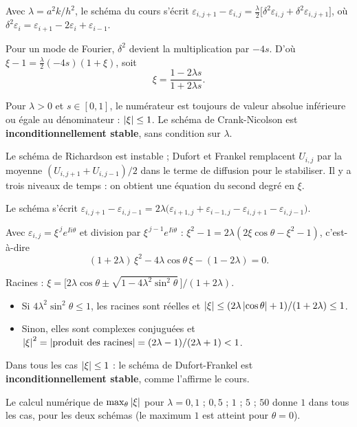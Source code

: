  Avec $\lambda = a^2k/h^2$, le schéma du cours s'écrit
$\varepsilon_{i,j+1} - \varepsilon_{i,j} = \frac\lambda2\bigl[\delta^2\varepsilon_{i,j}
+ \delta^2\varepsilon_{i,j+1}\bigr]$, où
$\delta^2\varepsilon_i = \varepsilon_{i+1} - 2\varepsilon_i + \varepsilon_{i-1}$.

 Pour un mode de Fourier, $\delta^2$ devient la multiplication par
$-4s$. D'où $\xi - 1 = \frac\lambda2(-4s)(1 + \xi)$, soit
\[
  \xi = \frac{1 - 2\lambda s}{1 + 2\lambda s} .
\]

 Pour $\lambda > 0$ et $s \in [0,1]$, le numérateur est toujours de
valeur absolue inférieure ou égale au dénominateur : $\left|\xi\right| \le 1$. Le
schéma de Crank-Nicolson est \textbf{inconditionnellement stable}, sans
condition sur $\lambda$.

\Pourquoi Le schéma de Richardson est instable ; Dufort et Frankel remplacent
$U_{i,j}$ par la moyenne $(U_{i,j+1} + U_{i,j-1})/2$ dans le terme de
diffusion pour le stabiliser. Il y a trois niveaux de temps : on obtient une
équation du second degré en $\xi$.

 Le schéma s'écrit
$\varepsilon_{i,j+1} - \varepsilon_{i,j-1} = 2\lambda\bigl(\varepsilon_{i+1,j}
+ \varepsilon_{i-1,j} - \varepsilon_{i,j+1} - \varepsilon_{i,j-1}\bigr)$.

 Avec $\varepsilon_{i,j} = \xi^{\,j}e^{Ii\theta}$ et division par
$\xi^{\,j-1}e^{Ii\theta}$ :
$\xi^2 - 1 = 2\lambda(2\xi\cos\theta - \xi^2 - 1)$, c'est-à-dire
\[
  (1 + 2\lambda)\,\xi^2 - 4\lambda\cos\theta\,\xi - (1 - 2\lambda) = 0 .
\]

 Racines :
$\xi = \bigl[2\lambda\cos\theta \pm \sqrt{1 - 4\lambda^2\sin^2\theta}\,\bigr]/(1 + 2\lambda)$.
\begin{itemize}
  \item Si $4\lambda^2\sin^2\theta \le 1$, les racines sont réelles et
        $\left|\xi\right| \le (2\lambda\left|\cos\theta\right| + 1)/(1 + 2\lambda) \le 1$.
  \item Sinon, elles sont complexes conjuguées et
        $\left|\xi\right|^2 = \left|\text{produit des racines}\right| =
        (2\lambda - 1)/(2\lambda + 1) < 1$.
\end{itemize}
Dans tous les cas $\left|\xi\right| \le 1$ : le schéma de Dufort-Frankel est
\textbf{inconditionnellement stable}, comme l'affirme le cours.

\Verif Le calcul numérique de $\max_\theta\left|\xi\right|$ pour
$\lambda = 0{,}1$ ; $0{,}5$ ; $1$ ; $5$ ; $50$ donne $1$ dans tous les cas, pour
les deux schémas (le maximum $1$ est atteint pour $\theta = 0$).

